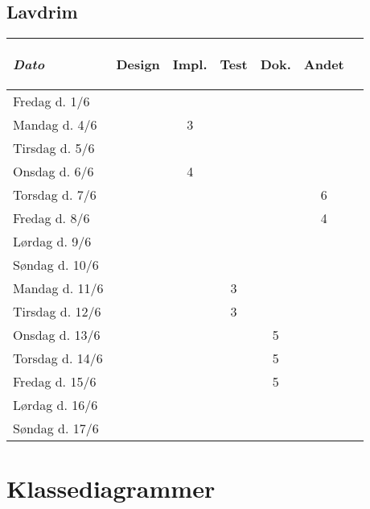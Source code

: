 \documentclass[a4paper]{article}
\begin{document}
\subsection{Lavdrim} %
\begin{tabular}{l | c c c c c | c}

  \emph{Dato}
  & \begin{sideways}Design\end{sideways} 
  & \begin{sideways}Impl.\end{sideways} 
  & \begin{sideways}Test\end{sideways} 
  & \begin{sideways}Dok.\end{sideways} 
  & \begin{sideways}Andet\end{sideways} \\
  \hline
  Fredag d. 1/6   &  &  &  &  & \\
  Mandag d. 4/6   &  & 3 &  &  & \\
  Tirsdag d. 5/6  &  &  &  &  & \\
  Onsdag d. 6/6   &  & 4 &  &  & \\
  Torsdag d. 7/6  &  &  &  &  & 6\\
  Fredag d. 8/6   &  &  &  &  & 4\\
  Lørdag d. 9/6   &  &  &  &  & \\
  Søndag d. 10/6  &  &  &  &  & \\
  Mandag d. 11/6  &  &  & 3 &  & \\
  Tirsdag d. 12/6 &  &  & 3 &  & \\
  Onsdag d. 13/6  &  &  &  & 5 & \\
  Torsdag d. 14/6 &  &  &  & 5  & \\
  Fredag d. 15/6  &  &  &  & 5 & \\
  Lørdag d. 16/6  &  &  &  &  & \\
  Søndag d. 17/6  &  &  &  &  & \\

\end{tabular}



\section{Klassediagrammer} %
\end{document}
